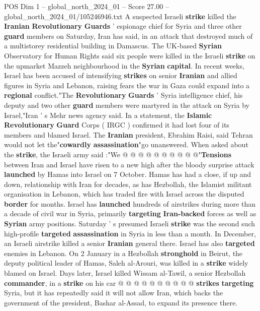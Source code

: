 \begin{textsample}{POS Dim 1 – global\_north\_2024\_01 – Score 27.00 – global\_north\_2024\_01/105246946.txt}  \label{ex:f1_pos_127}
A suspected Israeli \textbf{strike} killed the \textbf{Iranian} \textbf{Revolutionary} \textbf{Guards} ' espionage chief for Syria and three other \textbf{guard} members on Saturday, Iran has said, in an attack that destroyed much of a multistorey residential building in Damascus.
The UK-based \textbf{Syrian} Observatory for Human Rights said six people were killed in the Israeli \textbf{strike} on the upmarket Mazzeh neighbourhood in the \textbf{Syrian} \textbf{capital}.
In recent weeks, Israel has been accused of intensifying \textbf{strikes} on senior \textbf{Iranian} and allied figures in Syria and Lebanon, raising fears the war in Gaza could expand into a \textbf{regional} conflict."The \textbf{Revolutionary} \textbf{Guards} ' Syria intelligence chief, his deputy and two other \textbf{guard} members were martyred in the attack on Syria by Israel,"Iran ' s Mehr news agency said.
In a statement, the \textbf{Islamic} \textbf{Revolutionary} \textbf{Guard} Corps ( IRGC ) confirmed it had lost four of its members and blamed Israel.
The \textbf{Iranian} president, Ebrahim Raisi, said Tehran would not let the"\textbf{cowardly} \textbf{assassination}"go unanswered.
When asked about the \textbf{strike}, the Israeli army said :"We @ @ @ @ @ @ @ @ @ @"\textbf{Tensions} between Iran and Israel have risen to a new high after the bloody surprise attack \textbf{launched} by Hamas into Israel on 7 October.
Hamas has had a close, if up and down, relationship with Iran for decades, as has Hezbollah, the Islamist militant organisation in Lebanon, which has traded fire with Israel across the disputed \textbf{border} for months.
Israel has \textbf{launched} hundreds of airstrikes during more than a decade of civil war in Syria, primarily \textbf{targeting} \textbf{Iran-backed} forces as well as \textbf{Syrian} army positions.
Saturday ' s presumed Israeli \textbf{strike} was the second such high-profile \textbf{targeted} \textbf{assassination} in Syria in less than a month.
In December, an Israeli airstrike killed a senior \textbf{Iranian} general there.
Israel has also \textbf{targeted} enemies in Lebanon.
On 2 January in a Hezbollah \textbf{stronghold} in Beirut, the deputy political leader of Hamas, Saleh al-Arouri, was killed in a \textbf{strike} widely blamed on Israel.
Days later, Israel killed Wissam al-Tawil, a senior Hezbollah \textbf{commander}, in a \textbf{strike} on his car @ @ @ @ @ @ @ @ @ @ \textbf{strikes} \textbf{targeting} Syria, but it has repeatedly said it will not allow Iran, which backs the government of the president, Bashar al-Assad, to expand its presence there.

\end{textsample}
